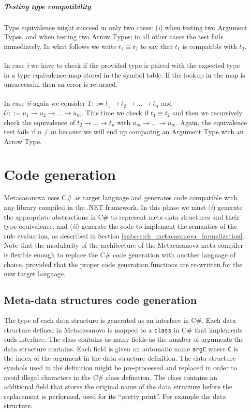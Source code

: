 \subparagraph{Testing type compatibility}

Type equivalence might succeed in only two cases: (\textit{i}) when testing two Argument Types, and when testing two Arrow Types; in all other cases the test fails immediately. In what follows we write $t_1 \equiv t_2$ to say that $t_1$ is compatible with $t_2$.\\\\
In case \textit{i} we have to check if the provided type is paired with the expected type in a type equivalence map stored in the symbol table. If the lookup in the map is unsuccessful then an error is returned.\\\\
In case \textit{ii} again we consider $T ::= t_1 \rightarrow t_2 \rightarrow ... \rightarrow t_n$ and $U ::= u_1 \rightarrow u_2 \rightarrow ... \rightarrow u_m$. This time we check if $t_1 \equiv t_2$ and then we recursively check the equivalence of $t_2 \rightarrow ... \rightarrow t_n$ with $u_m \rightarrow ... \rightarrow u_m$. Again, the equivalence test fails if $n \neq m$ because we will end up comparing an Argument Type with an Arrow Type.

\section{Code generation}
\label{sec:ch_metacasanova_code_generation}
Metacasanova uses C\# as target language and generates code compatible with any library compiled in the .NET framework. In this phase we must (\textit{i}) generate the appropriate abstractions in C\# to represent meta-data structures and their type equivalence, and (\textit{ii}) generate the code to implement the semantics of the rule evaluation, as described in Section \ref{subsec:ch_metacasanova_formalization}. Note that the modularity of the architecture of the Metacasanova meta-compiler is flexible enough to replace the C\# code generation with another language of choice, provided that the proper code generation functions are re-written for the new target language.

\subsection{Meta-data structures code generation}
The type of each data structure is generated as an interface in C\#. Each data structure defined in Metacasanova is mapped to a \texttt{class} in C\# that implements such interface. The class contains as many fields as the number of arguments the data structure contains. Each field is given an automatic name \texttt{argC} where \texttt{C} is the index of the argument in the data structure definition. The data structure symbols used in the definition might be pre-processed and replaced in order to avoid illegal characters in the C\# class definition. The class contains an additional field that stores the original name of the data structure before the replacement is performed, used for its ``pretty print''. For example the data structure.

